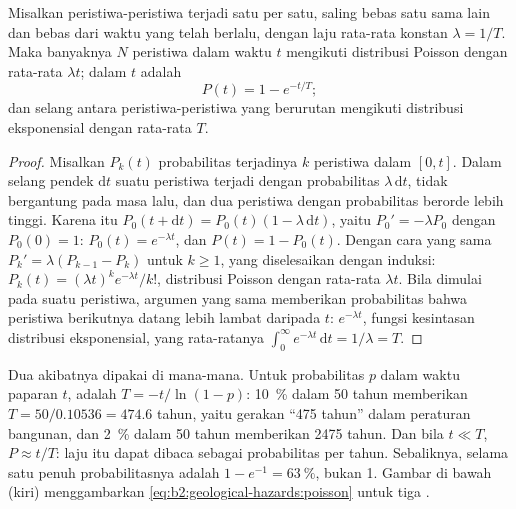 \begin{proposition}\label{prop:b2:geological-hazards:poisson}
Misalkan peristiwa-peristiwa terjadi satu per satu, saling bebas satu sama
lain dan bebas dari waktu yang telah berlalu, dengan laju rata-rata konstan $\lambda = 1/T$. Maka banyaknya $N$
peristiwa dalam waktu $t$ mengikuti distribusi Poisson dengan rata-rata $\lambda t$;  dalam $t$ adalah
\begin{equation}
P(t) = 1 - e^{-t/T};
\label{eq:b2:geological-hazards:poisson}
\end{equation}
dan selang antara peristiwa-peristiwa yang berurutan mengikuti distribusi eksponensial dengan rata-rata $T$.
\end{proposition}

\begin{proof}
Misalkan $P_k(t)$ probabilitas terjadinya $k$ peristiwa dalam $[0, t]$. Dalam selang pendek $\mathrm{d}t$ suatu
peristiwa terjadi dengan probabilitas $\lambda\,\mathrm{d}t$, tidak bergantung pada masa lalu, dan dua peristiwa dengan
probabilitas berorde lebih tinggi. Karena itu $P_0(t + \mathrm{d}t) = P_0(t)(1 - \lambda\,\mathrm{d}t)$, yaitu
$P_0' = -\lambda P_0$ dengan $P_0(0) = 1$: $P_0(t) = e^{-\lambda t}$, dan $P(t) = 1 - P_0(t)$. Dengan
cara yang sama $P_k' = \lambda(P_{k-1} - P_k)$ untuk $k \geq 1$, yang diselesaikan dengan induksi:
$P_k(t) = (\lambda t)^k e^{-\lambda t}/k!$, distribusi Poisson dengan rata-rata $\lambda t$. Bila dimulai pada
suatu peristiwa, argumen yang sama memberikan probabilitas bahwa peristiwa berikutnya datang lebih lambat daripada $t$:
$e^{-\lambda t}$, fungsi kesintasan distribusi eksponensial, yang rata-ratanya
$\int_0^\infty e^{-\lambda t}\,\mathrm{d}t = 1/\lambda = T$.
\end{proof}

Dua akibatnya dipakai di mana-mana. Untuk probabilitas $p$ dalam waktu paparan $t$,  adalah $T = -t/\ln(1 - p)$: \qty{10}{\percent} dalam 50 tahun memberikan $T = 50/0.10536 =
474.6$ tahun, yaitu gerakan ``475 tahun'' dalam peraturan bangunan, dan \qty{2}{\percent} dalam 50 tahun
memberikan 2475 tahun. Dan bila $t \ll T$, $P \approx t/T$: laju itu dapat dibaca sebagai
probabilitas per tahun. Sebaliknya, selama satu  penuh probabilitasnya adalah $1 - e^{-1} =
\qty{63}{\percent}$, bukan 1. Gambar di bawah (kiri) menggambarkan \eqref{eq:b2:geological-hazards:poisson}
untuk tiga .

